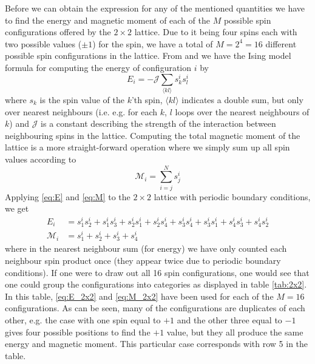 \documentclass[12pt]{article}
\numberwithin{figure}{section}
\numberwithin{table}{section}
\begin{document}
\noindent Before we can obtain the expression for any of the mentioned quantities we have to find the energy and magnetic moment of each of the $M$ possible spin configurations offered by the $2\times2$ lattice. Due to it being four spins each with two possible values ($\pm 1$) for the spin, we have a total of $M=2^4=16$ different possible spin configurations in the lattice. From \cite{Comp} and \cite{pro4} we have the Ising model formula for computing the energy of configuration $i$ by
\begin{equation}
	E_i=-\mathcal{J}\sum_{\langle kl \rangle}s_k^is_l^i \label{eq:E}
\end{equation}
where $s_k$ is the spin value of the $k$'th spin, $\langle kl \rangle$ indicates a double sum, but only over nearest neighbours (i.e. e.g. for each $k$, $l$ loops over the nearest neighbours of $k$) and $\mathcal{J}$ is a constant describing the strength of the interaction between neighbouring spins in the lattice. Computing the total magnetic moment of the lattice is a more straight-forward operation where we simply sum up all spin values according to \cite{Comp}
\begin{equation}
	\mathcal{M}_i=\sum_{i=j}^Ns_j^i \label{eq:M}
\end{equation}
Applying \eqref{eq:E} and \eqref{eq:M} to the $2\times2$ lattice with periodic boundary conditions, we get
\begin{align}
	E_i&=s_1^is_2^i+s_1^is_3^i+s_2^is_1^i+s_2^is_4^i+s_3^is_4^i+s_3^is_1^i+s_4^is_3^i+s_4^is_2^i \label{eq:E_2x2}\\
	\mathcal{M}_i&=s_1^i+s_2^i+s_3^i+s_4^i \label{eq:M_2x2}
\end{align}
where in the nearest neighbour sum (for energy) we have only counted each neighbour spin product once (they appear twice due to periodic boundary conditions). If one were to draw out all 16 spin configurations, one would see that one could group the configurations into categories as displayed in table \ref{tab:2x2}. In this table, \eqref{eq:E_2x2} and \eqref{eq:M_2x2} have been used for each of the $M=16$ configurations. As can be seen, many of the configurations are duplicates of each other, e.g. the case with one spin equal to $+1$ and the other three equal to $-1$ gives four possible positions to find the $+1$ value, but they all produce the same energy and magnetic moment. This particular case corresponds with row 5 in the table.
\vspace{0.30cm}
\end{document}
